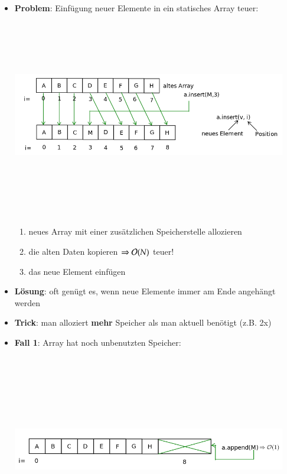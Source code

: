 \begin{itemize}
    \item \textbf{Problem}: Einfügung neuer Elemente in ein statisches Array teuer: \\
    \includegraphics[width=12cm,height=9cm,keepaspectratio]{./Pictures/dynamischesArray.png}
    \begin{enumerate}
        \item neues Array mit einer zusätzlichen Speicherstelle allozieren
        \item die alten Daten kopieren $\Rightarrow \mathcal{O}{}(N)$ teuer!
        \item das neue Element einfügen
    \end{enumerate}
    \item \textbf{Lösung}: oft genügt es, wenn neue Elemente immer am Ende angehängt werden
    \item \textbf{Trick}: man alloziert \textbf{mehr} Speicher als man aktuell benötigt (z.B. 2x)
    \item \textbf{Fall 1}: Array hat noch unbenutzten Speicher: \\
    \includegraphics[width=12cm,height=9cm,keepaspectratio]{./Pictures/dynArrunbenutzt.png}

\end{itemize}
